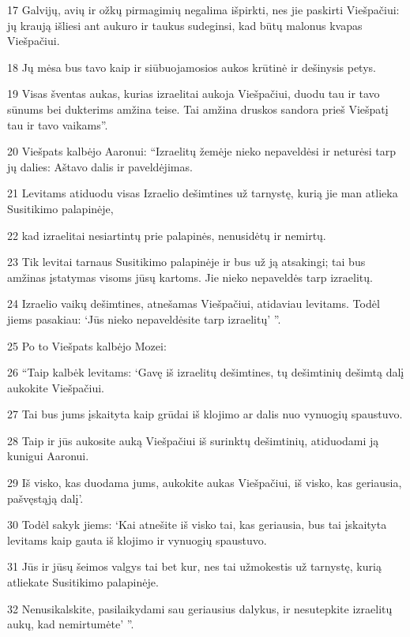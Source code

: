 \par 17 Galvijų, avių ir ožkų pirmagimių negalima išpirkti, nes jie paskirti Viešpačiui: jų kraują išliesi ant aukuro ir taukus sudeginsi, kad būtų malonus kvapas Viešpačiui. 
\par 18 Jų mėsa bus tavo kaip ir siūbuojamosios aukos krūtinė ir dešinysis petys. 
\par 19 Visas šventas aukas, kurias izraelitai aukoja Viešpačiui, duodu tau ir tavo sūnums bei dukterims amžina teise. Tai amžina druskos sandora prieš Viešpatį tau ir tavo vaikams”. 
\par 20 Viešpats kalbėjo Aaronui: “Izraelitų žemėje nieko nepaveldėsi ir neturėsi tarp jų dalies: Aš­tavo dalis ir paveldėjimas. 
\par 21 Levitams atiduodu visas Izraelio dešimtines už tarnystę, kurią jie man atlieka Susitikimo palapinėje, 
\par 22 kad izraelitai nesiartintų prie palapinės, nenusidėtų ir nemirtų. 
\par 23 Tik levitai tarnaus Susitikimo palapinėje ir bus už ją atsakingi; tai bus amžinas įstatymas visoms jūsų kartoms. Jie nieko nepaveldės tarp izraelitų. 
\par 24 Izraelio vaikų dešimtines, atnešamas Viešpačiui, atidaviau levitams. Todėl jiems pasakiau: ‘Jūs nieko nepaveldėsite tarp izraelitų’ ”. 
\par 25 Po to Viešpats kalbėjo Mozei: 
\par 26 “Taip kalbėk levitams: ‘Gavę iš izraelitų dešimtines, tų dešimtinių dešimtą dalį aukokite Viešpačiui. 
\par 27 Tai bus jums įskaityta kaip grūdai iš klojimo ar dalis nuo vynuogių spaustuvo. 
\par 28 Taip ir jūs aukosite auką Viešpačiui iš surinktų dešimtinių, atiduodami ją kunigui Aaronui. 
\par 29 Iš visko, kas duodama jums, aukokite aukas Viešpačiui, iš visko, kas geriausia, pašvęstąją dalį’. 
\par 30 Todėl sakyk jiems: ‘Kai atnešite iš visko tai, kas geriausia, bus tai įskaityta levitams kaip gauta iš klojimo ir vynuogių spaustuvo. 
\par 31 Jūs ir jūsų šeimos valgys tai bet kur, nes tai užmokestis už tarnystę, kurią atliekate Susitikimo palapinėje. 
\par 32 Nenusikalskite, pasilaikydami sau geriausius dalykus, ir nesutepkite izraelitų aukų, kad nemirtumėte’ ”.



